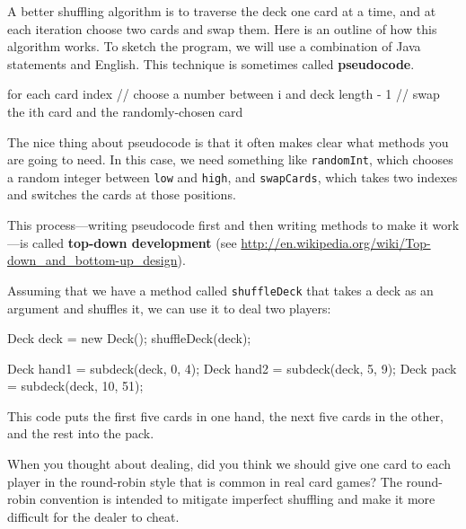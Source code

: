 \documentclass[12pt]{book}
\theoremstyle{exercise}
\newcommand{\java}[1]{\verb"#1"}
\newcommand{\java}[1]{\lstinline{#1}} %
\begin{document}
A better shuffling algorithm is to traverse the deck one card at a time, and at each iteration choose two cards and swap them.
Here is an outline of how this algorithm works.
To sketch the program, we will use a combination of Java statements and English.
This technique is sometimes called {\bf pseudocode}.

\begin{code}
    for each card index {
        // choose a number between i and deck length - 1
        // swap the ith card and the randomly-chosen card
    }
\end{code}


The nice thing about pseudocode is that it often makes clear what methods you are going to need.
In this case, we need something like \java{randomInt}, which chooses a random integer between \java{low} and \java{high}, and \java{swapCards}, which takes two indexes and switches the cards at those positions.


This process---writing pseudocode first and then writing methods to make it work---is called {\bf top-down development} (see \url{http://en.wikipedia.org/wiki/Top-down_and_bottom-up_design}).


Assuming that we have a method called \java{shuffleDeck} that takes a deck as an argument and shuffles it, we can use it to deal two players:

\begin{code}
    Deck deck = new Deck();
    shuffleDeck(deck);

    Deck hand1 = subdeck(deck, 0, 4);
    Deck hand2 = subdeck(deck, 5, 9);
    Deck pack = subdeck(deck, 10, 51);
\end{code}

This code puts the first five cards in one hand, the next five cards in the other, and the rest into the pack.

When you thought about dealing, did you think we should give one card to each player in the round-robin style that is common in real card games?
The round-robin convention is intended to mitigate imperfect shuffling and make it more difficult for the dealer to cheat.

\end{document}
